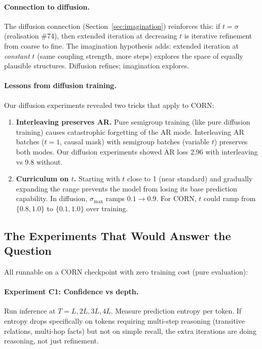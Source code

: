 \documentclass[11pt, a4paper]{article}
\theoremstyle{plain}
\theoremstyle{definition}
\theoremstyle{remark}
\begin{document}
\paragraph{Connection to diffusion.}
The diffusion connection (Section~\ref{sec:imagination}) reinforces this: if $t = \sigma$ (realisation \#74), then extended iteration at decreasing $t$ is iterative refinement from coarse to fine.
The imagination hypothesis adds: extended iteration at \emph{constant} $t$ (same coupling strength, more steps) explores the space of equally plausible structures.
Diffusion refines; imagination explores.

\paragraph{Lessons from diffusion training.}
Our diffusion experiments revealed two tricks that apply to CORN:
\begin{enumerate}[nosep]
    \item \textbf{Interleaving preserves AR.} Pure semigroup training (like pure diffusion training) causes catastrophic forgetting of the AR mode. Interleaving AR batches ($t{=}1$, causal mask) with semigroup batches (variable $t$) preserves both modes. Our diffusion experiments showed AR loss 2.96 with interleaving vs 9.8 without.
    \item \textbf{Curriculum on $t$.} Starting with $t$ close to 1 (near standard) and gradually expanding the range prevents the model from losing its base prediction capability. In diffusion, $\sigma_{\max}$ ramps $0.1 \to 0.9$. For CORN, $t$ could ramp from $\{0.8, 1.0\}$ to $\{0.1, 1.0\}$ over training.
\end{enumerate}

\subsection{The Experiments That Would Answer the Question}

All runnable on a CORN checkpoint with zero training cost (pure evaluation):

\paragraph{Experiment C1: Confidence vs depth.}
Run inference at $T{=}L, 2L, 3L, 4L$.
Measure prediction entropy per token.
If entropy drops specifically on tokens requiring multi-step reasoning (transitive relations, multi-hop facts) but not on simple recall, the extra iterations are doing reasoning, not just refinement.
\end{document}
